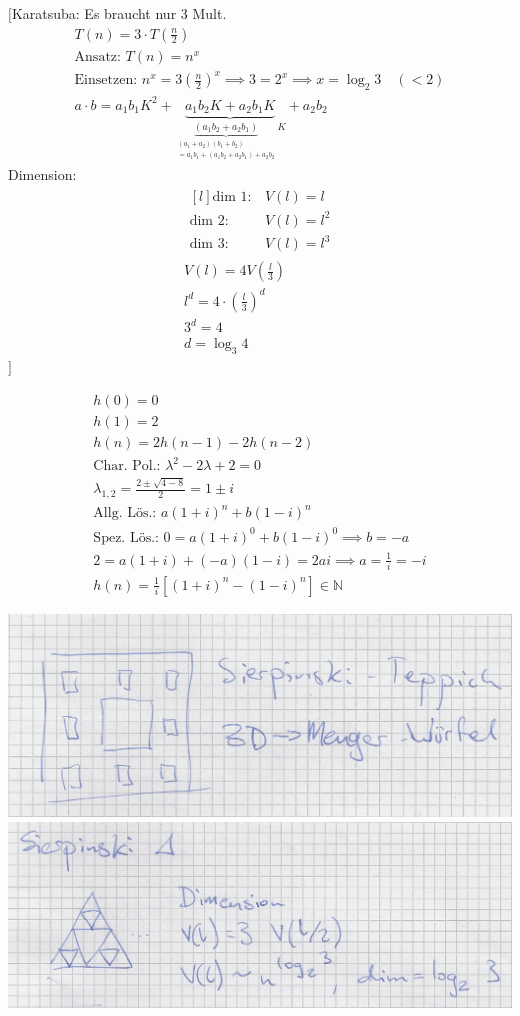 $\Bigg[$Karatsuba: Es braucht nur 3 Mult.
\begin{gather*}
	T(n) = 3 \cdot T\left(\frac{n}{2}\right) \\
	\text{Ansatz: } T(n) = n^x \\
	\text{Einsetzen: } n^x = 3\left(\frac{n}{2}\right)^x \implies 3 =2^x \implies x = \log_2 3 \quad (<2) \\
	a \cdot b = a_1 b_1 K^2 + \underbrace{a_1 b_2 K + a_2 b_1 K}_{\underbrace{(a_1 b_2 + a_2 b_1)}_{\substack{(a_1 + a_2)(b_1 + b_2)\\ = a_1 b_1 + (a_1 b_2 + a_2 b_1) + a_2 b_2}}K} + a_2 b_2
\end{gather*}
Dimension:
\begin{gather*}
	\begin{matrix*}[l]
		\text{dim } 1:	&V(l) = l	\\
		\text{dim } 2:	&V(l) = l^2	\\
		\text{dim } 3:	&V(l) = l^3	
	\end{matrix*}\\
	V(l) = 4 V\left(\frac{l}{3}\right) \\
	l^d = 4 \cdot \left(\frac{l}{3} \right)^d \\
	3^d = 4 \\
	d = \log_3 4
\end{gather*}
$\Bigg]$\\
\begin{bsp}
	\begin{gather*}
		h(0) = 0 \\
		h(1) = 2 \\
		h(n) = 2h(n-1) - 2h(n-2) \\
		\text{Char. Pol.: } \lambda^2 - 2\lambda + 2 = 0 \\
		\lambda_{1,2} = \frac{2 \pm \sqrt{4-8}}{2} = 1 \pm i \\
		\text{Allg. Lös.: } a(1+i)^n + b(1-i)^n \\
		\text{Spez. Lös.: } 0 = a(1+i)^0 + b(1-i)^0 \implies b = -a \\
		2 = a(1+i) + (-a)(1-i) = 2ai \implies a = \frac{1}{i} = -i \\
		h(n) = \frac{1}{i} [(1+i)^n - (1-i)^n] \in \mathbb{N}
	\end{gather*}
\end{bsp}
\includegraphics{Bild26} \\
\includegraphics{Bild27}